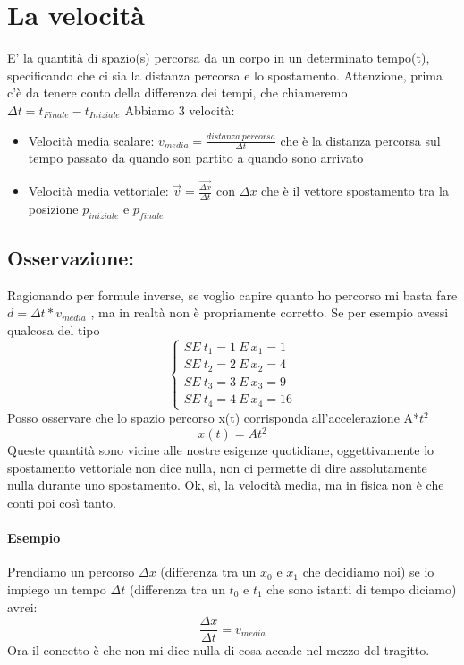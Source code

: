 \documentclass[12pt, a4paper, openany, oneside]{book}
\begin{document}
\section{La velocità}
E' la quantità di spazio(s) percorsa da un corpo in un determinato tempo(t),
specificando che ci sia la distanza percorsa e lo spostamento.
\newline \newline
Attenzione, prima c'è da tenere conto della differenza dei tempi, che chiameremo 
$\Delta t = t_{Finale} - t_{Iniziale}$
\newline
Abbiamo 3 velocità:
\begin{itemize}
	\item {Velocità media scalare: $v_{media} = \frac{distanza~percorsa}{\Delta
	t}$ che è la distanza percorsa sul tempo passato da quando son partito a 
	quando sono arrivato }
	\item {Velocità media vettoriale: $\vec{v} = \frac{\vec{\Delta x}}
	{\Delta t}$ con $\Delta x$ che è il vettore spostamento tra la posizione 
	$p_{iniziale}$ e $p_{finale}$ }
\end{itemize}
\subsection*{Osservazione:}
Ragionando per formule inverse, se voglio capire quanto ho percorso mi basta 
fare $d = \Delta t * v_{media}$ , ma in realtà non è propriamente corretto. 
\newline \newline
Se per esempio avessi qualcosa del tipo
$$
\begin{cases}
SE ~ t_{1} = 1 ~ E ~ x_{1} = 1  \\ 
SE ~ t_{2} = 2 ~ E ~ x_{2} = 4  \\ 
SE ~ t_{3} = 3 ~ E ~ x_{3} = 9  \\
SE ~ t_{4} = 4 ~ E ~ x_{4} = 16 
\end{cases}$$
Posso osservare che lo spazio percorso x(t) corrisponda all'accelerazione A*$t^{2}$
$$x(t) = At^{2}$$
Queste quantità sono vicine alle nostre esigenze quotidiane, oggettivamente lo
spostamento vettoriale non dice nulla, non ci permette di dire assolutamente
nulla durante uno spostamento. Ok, sì, la velocità media, ma in fisica non è che
conti poi così tanto.
\paragraph{Esempio}	
Prendiamo un percorso $\Delta x$ (differenza tra un $x_{0} $ e $x_{1}$ che
decidiamo noi) se io impiego un tempo $\Delta t$ (differenza tra un $t_{0} $ e 
$t_{1}$ che sono istanti di tempo diciamo) avrei: $$\frac{\Delta x}{\Delta t} 
= v_{media}$$ Ora il concetto è che non mi dice nulla di cosa accade nel mezzo
del tragitto. 
\end{document}
